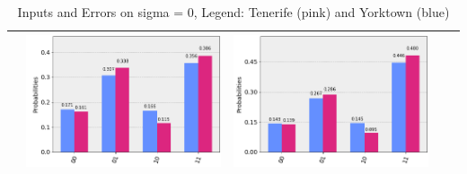 \documentclass[11pt]{article}
\begin{document}
\begin{table}[h!]
\begin{tabular}{| c | c | c | c | c | }
\begin{minipage}{.215\textwidth}
      \end{minipage}
      &\begin{minipage}{.215\textwidth}
        \includegraphics[width=\linewidth]{img/qecc3_Z11.png}
      \end{minipage}
      &\begin{minipage}{.215\textwidth}
        \includegraphics[width=\linewidth]{img/qecc3_I11.png}
      \end{minipage}
      \\ \hline
    \end{tabular}
    \caption{Inputs and Errors on sigma = 0, Legend: Tenerife (pink) and Yorktown (blue)}\label{tbl:sig0}
\end{table}
\end{document}
